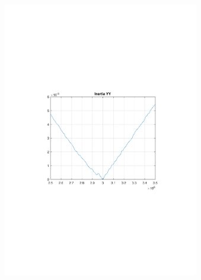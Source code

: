 \documentclass{beamer}
\begin{document}
\begin{frame}
\begin{columns}[t]
\begin{figure}
				\includegraphics[trim=4cm 9cm 4cm 9cm, clip=true, width=\linewidth]{img/inertia_yy}
			\end{figure}
			\begin{figure}
				\centering

\end{figure}
\end{columns}
\end{frame}
\end{document}
